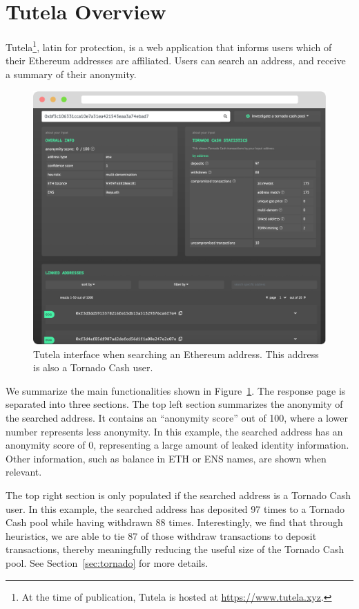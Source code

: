 \section{Tutela Overview} \label{sec:tutela}

Tutela\footnote{At the time of publication, Tutela is hosted at \url{https://www.tutela.xyz}.}, latin for protection, is a web application that informs users which of their Ethereum addresses are affiliated. Users can search an address, and receive a summary of their anonymity.

\begin{figure}[h!]
\includegraphics[width=\linewidth]{figures/demo.pdf}
\caption{Tutela interface when searching an Ethereum address. This address is also a Tornado Cash user.}
\label{fig:demo}
\end{figure}

We summarize the main functionalities shown in Figure~\ref{fig:demo}. The response page is separated into three sections. The top left section summarizes the anonymity of the searched address. It contains an ``anonymity score'' out of 100, where a lower number represents less anonymity. In this example, the searched address has an anonymity score of 0, representing a large amount of leaked identity information. Other information, such as balance in ETH or ENS names, are shown when relevant.

The top right section is only populated if the searched address is a Tornado Cash user. In this example, the searched address has deposited 97 times to a Tornado Cash pool while having withdrawn 88 times. Interestingly, we find that through heuristics, we are able to tie 87 of those withdraw transactions to deposit transactions, thereby meaningfully reducing the useful size of the Tornado Cash pool. See Section~\ref{sec:tornado} for more details.

